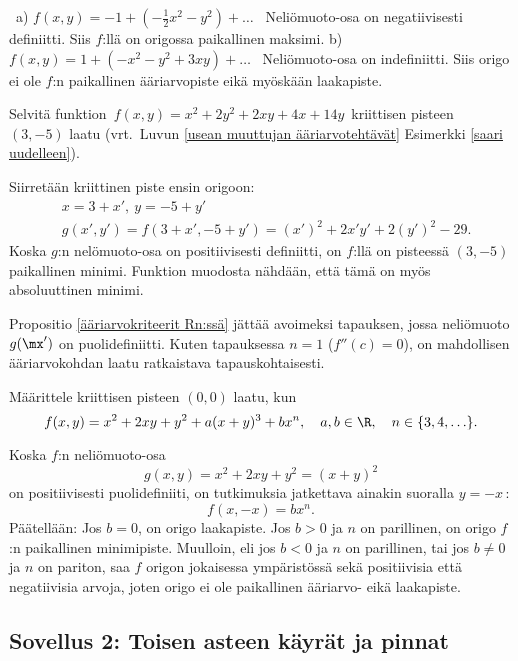 \ratk \ a) $f(x,y)=-1+(-\frac{1}{2}x^2-y^2)+\ldots$ \ Neliömuoto-osa on negatiivisesti
definiitti. Siis $f$:llä on origossa paikallinen maksimi. \vspace{1mm}\newline
b) $\displaystyle{f(x,y)=1+(-x^2-y^2+3xy)+\ldots}$ \ Neliömuoto-osa on indefiniitti. Siis
origo ei ole $f$:n paikallinen ääriarvopiste eikä myöskään laakapiste. \loppu
\begin{Exa}
Selvitä funktion $\,f(x,y)=x^2+2y^2+2xy+4x+14y\,$ kriittisen pisteen $(3,-5)$ laatu 
(vrt.\ Luvun \ref{usean muuttujan ääriarvotehtävät} Esimerkki \ref{saari uudelleen}).
\end{Exa}
\ratk Siirretään kriittinen piste ensin origoon:
\begin{align*}
&x=3+x',\ y=-5+y' \\
&g(x',y')=f(3+x',-5+y') = (x')^2+2x'y'+2(y')^2-29.
\end{align*}
Koska $g$:n nelömuoto-osa on positiivisesti definiitti, on $f$:llä on pisteessä $(3,-5)$ 
paikallinen minimi. Funktion muodosta nähdään, että tämä on myös absoluuttinen minimi. \loppu

Propositio \ref{ääriarvokriteerit Rn:ssä} jättää avoimeksi tapauksen, jossa neliömuoto $g(\mx')$
on puolidefiniitti. Kuten tapauksessa $n=1$ ($f''(c)=0$), on mahdollisen ääriarvokohdan laatu 
ratkaistava tapauskohtaisesti.
\begin{Exa}
Määrittele kriittisen pisteen $(0,0)$ laatu, kun
\[
f(x,y)=x^2+2xy+y^2+a(x+y)^3+bx^n,\quad a,b\in\R,\quad n\in\{3,4,\ldots\}.
\]
\end{Exa}
\ratk Koska $f$:n neliömuoto-osa
\[
g(x,y)=x^2+2xy+y^2=(x+y)^2
\]
on positiivisesti puolidefiniiti, on tutkimuksia jatkettava ainakin suoralla $y=-x$\,:
\[
f(x,-x)=bx^n.
\]
Päätellään: Jos $b=0$, on origo laakapiste. Jos $b>0$ ja $n$ on parillinen, on origo $f$:n 
paikallinen minimipiste. Muulloin, eli jos $b<0$ ja $n$ on parillinen, tai jos $b \neq 0$ ja
$n$ on pariton, saa $f$ origon jokaisessa ympäristössä sekä positiivisia että negatiivisia
arvoja, joten origo ei ole paikallinen ääriarvo- eikä laakapiste. \loppu

\subsection{Sovellus 2: Toisen asteen käyrät ja pinnat}
 

